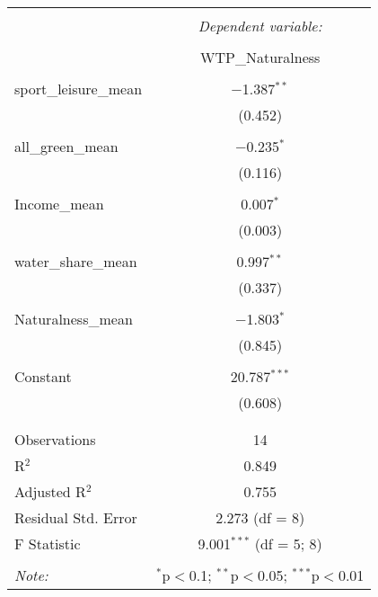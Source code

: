 
\begin{table}[!htbp] \centering 
  \caption{} 
  \label{} 
\begin{tabular}{@{\extracolsep{5pt}}lc} 
\\[-1.8ex]\hline 
\hline \\[-1.8ex] 
 & \multicolumn{1}{c}{\textit{Dependent variable:}} \\ 
\cline{2-2} 
\\[-1.8ex] & WTP\_Naturalness \\ 
\hline \\[-1.8ex] 
 sport\_leisure\_mean & $-$1.387$^{**}$ \\ 
  & (0.452) \\ 
  & \\ 
 all\_green\_mean & $-$0.235$^{*}$ \\ 
  & (0.116) \\ 
  & \\ 
 Income\_mean & 0.007$^{*}$ \\ 
  & (0.003) \\ 
  & \\ 
 water\_share\_mean & 0.997$^{**}$ \\ 
  & (0.337) \\ 
  & \\ 
 Naturalness\_mean & $-$1.803$^{*}$ \\ 
  & (0.845) \\ 
  & \\ 
 Constant & 20.787$^{***}$ \\ 
  & (0.608) \\ 
  & \\ 
\hline \\[-1.8ex] 
Observations & 14 \\ 
R$^{2}$ & 0.849 \\ 
Adjusted R$^{2}$ & 0.755 \\ 
Residual Std. Error & 2.273 (df = 8) \\ 
F Statistic & 9.001$^{***}$ (df = 5; 8) \\ 
\hline 
\hline \\[-1.8ex] 
\textit{Note:}  & \multicolumn{1}{r}{$^{*}$p$<$0.1; $^{**}$p$<$0.05; $^{***}$p$<$0.01} \\ 
\end{tabular} 
\end{table} 
